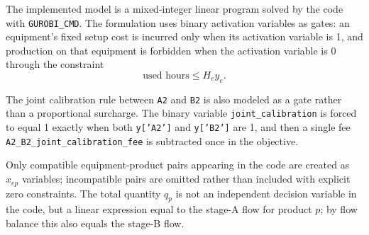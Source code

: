 The implemented model is a mixed-integer linear program solved by the code with \texttt{GUROBI\_CMD}. The formulation uses binary activation variables as gates: an equipment's fixed setup cost is incurred only when its activation variable is 1, and production on that equipment is forbidden when the activation variable is 0 through the constraint
\[
\text{used hours}\le H_e y_e.
\]

The joint calibration rule between \texttt{A2} and \texttt{B2} is also modeled as a gate rather than a proportional surcharge. The binary variable \texttt{joint\_calibration} is forced to equal 1 exactly when both \texttt{y['A2']} and \texttt{y['B2']} are 1, and then a single fee \texttt{A2\_B2\_joint\_calibration\_fee} is subtracted once in the objective.

Only compatible equipment-product pairs appearing in the code are created as \(x_{ep}\) variables; incompatible pairs are omitted rather than included with explicit zero constraints. The total quantity \(q_p\) is not an independent decision variable in the code, but a linear expression equal to the stage-A flow for product \(p\); by flow balance this also equals the stage-B flow.
